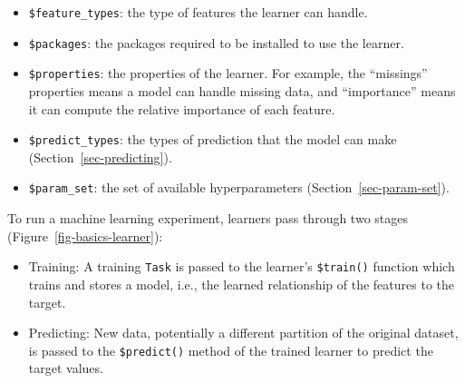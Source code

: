 \begin{itemize}
\tightlist
\item
  \texttt{\$feature\_types}: the type of features the learner can
  handle.
\item
  \texttt{\$packages}: the packages required to be installed to use the
  learner.
\item
  \texttt{\$properties}: the properties of the learner. For example, the
  ``missings'' properties means a model can handle missing data, and
  ``importance'' means it can compute the relative importance of each
  feature.
\item
  \texttt{\$predict\_types}: the types of prediction that the model can
  make (Section~\ref{sec-predicting}).
\item
  \texttt{\$param\_set}: the set of available hyperparameters
  (Section~\ref{sec-param-set}).
\end{itemize}

To run a machine learning experiment, learners pass through two stages
(Figure~\ref{fig-basics-learner}):

\begin{itemize}
\tightlist
\item
  Training:
  A training \texttt{Task} is passed to the learner's
  \texttt{\$train()} function
  which trains and stores a model, i.e., the learned
  relationship of the features to the target.
\item
  Predicting:
  New data, potentially a different partition of the original dataset,
  is passed to the
  \texttt{\$predict()}
  method of the trained learner to predict the target values.
\end{itemize}

